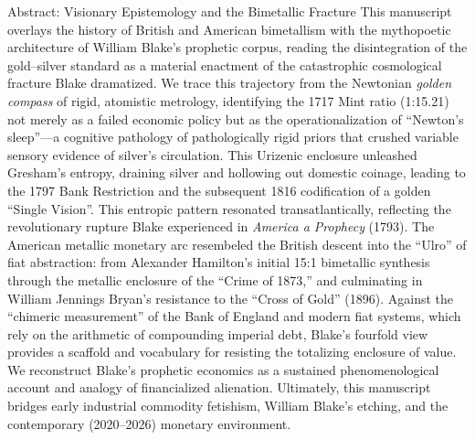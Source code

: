 \documentclass[
  ignorenonframetext,
]{beamer}
\author{\texorpdfstring{}{}}
\date{}
\begin{document}
\begin{frame}{Abstract: Visionary Epistemology and the Bimetallic
Fracture}
\protect{}\label{abstract-visionary-epistemology-and-the-bimetallic-fracture}
This manuscript overlays the history of British and American bimetallism
with the mythopoetic architecture of William Blake's prophetic corpus,
reading the disintegration of the gold--silver standard as a material
enactment of the catastrophic cosmological fracture Blake dramatized. We
trace this trajectory from the Newtonian \emph{golden compass} of rigid,
atomistic metrology, identifying the 1717 Mint ratio (1:15.21) not
merely as a failed economic policy but as the operationalization of
``Newton's sleep''---a cognitive pathology of pathologically rigid
priors that crushed variable sensory evidence of silver's circulation.
This Urizenic enclosure unleashed Gresham's entropy, draining silver and
hollowing out domestic coinage, leading to the 1797 Bank Restriction and
the subsequent 1816 codification of a golden ``Single Vision''. This
entropic pattern resonated transatlantically, reflecting the
revolutionary rupture Blake experienced in \emph{America a Prophecy}
(1793). The American metallic monetary arc resembeled the British
descent into the ``Ulro'' of fiat abstraction: from Alexander Hamilton's
initial 15:1 bimetallic synthesis through the metallic enclosure of the
``Crime of 1873,'' and culminating in William Jennings Bryan's
resistance to the ``Cross of Gold'' (1896). Against the ``chimeric
measurement'' of the Bank of England and modern fiat systems, which rely
on the arithmetic of compounding imperial debt, Blake's fourfold view
provides a scaffold and vocabulary for resisting the totalizing
enclosure of value. We reconstruct Blake's prophetic economics as a
sustained phenomenological account and analogy of financialized
alienation. Ultimately, this manuscript bridges early industrial
commodity fetishism, William Blake's etching, and the contemporary
(2020--2026) monetary environment.
\end{frame}
\end{document}
